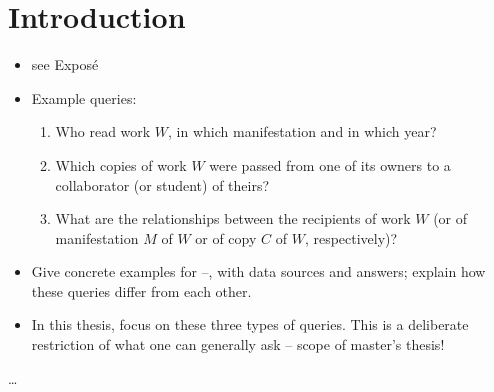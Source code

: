 
\chapter{Introduction}
\label{chap:intro}

\begin{itemize}
  \item
    see Exposé
  \item
    Example queries:
    \begin{enumerate}
      \item[\exaquery{1}]
        Who read work $W$, in which manifestation and in which year?
      \item[\exaquery{2}]
        Which copies of work $W$ were passed from one of its owners to a collaborator (or student) of theirs?
      \item[\exaquery{3}]
        What are the relationships between the recipients of work $W$
        (or of manifestation $M$ of $W$ or of copy $C$ of $W$, respectively)?
    \end{enumerate}
  \item
    Give concrete examples for --, with data sources and answers; explain how these queries differ from each other.
  \item
    In this thesis, focus on these three types of queries.
    This is a deliberate restriction of what one can generally ask – scope of master's thesis!
\end{itemize}



\dots

